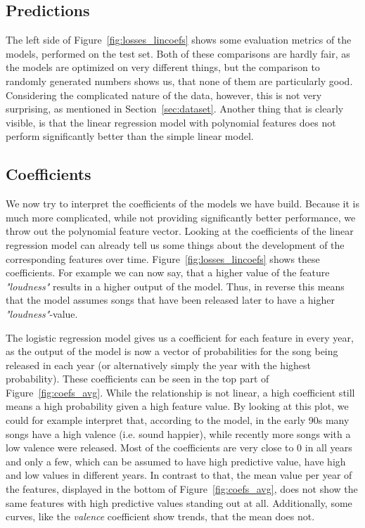 \documentclass{article}
\begin{document}
\subsection{Predictions}

The left side of Figure~\ref{fig:losses_lincoefs} shows some evaluation metrics of the models, performed on the test set. 
Both of these comparisons are hardly fair, as the models are optimized on very different things, but the comparison to randomly generated numbers shows us, that none of them are particularly good. Considering the complicated nature of the data, however, this is not very surprising, as mentioned in Section~\ref{sec:dataset}.
Another thing that is clearly visible, is that the linear regression model with polynomial features does not perform significantly better than the simple linear model.

\subsection{Coefficients}

We now try to interpret the coefficients of the models we have build. Because it is much more complicated, while not providing significantly better performance, we throw out the polynomial feature vector. Looking at the coefficients of the linear regression model can already tell us some things about the development of the corresponding features over time. Figure~\ref{fig:losses_lincoefs} shows these coefficients. For example we can now say, that a higher value of the feature \emph{"loudness"} results in a higher output of the model. Thus, in reverse this means that the model assumes songs that have been released later to have a higher \emph{"loudness"}-value.

The logistic regression model gives us a coefficient for each feature in every year, as the output of the model is now a vector of probabilities for the song being released in each year (or alternatively simply the year with the highest probability). These coefficients can be seen in the top part of Figure~\ref{fig:coefs_avg}. While the relationship is not linear, a high coefficient still means a high probability given a high feature value. By looking at this plot, we could for example interpret that, according to the model, in the early 90s many songs have a high valence (i.e. sound happier), while recently more songs with a low valence were released.
Most of the coefficients are very close to 0 in all years and only a few, which can be assumed to have high predictive value, have high and low values in different years. 
In contrast to that, the mean value per year of the features, displayed in the bottom of Figure~\ref{fig:coefs_avg}, does not show the same features with high predictive values standing out at all. Additionally, some curves, like the \emph{valence} coefficient show trends, that the mean does not.
\end{document}
